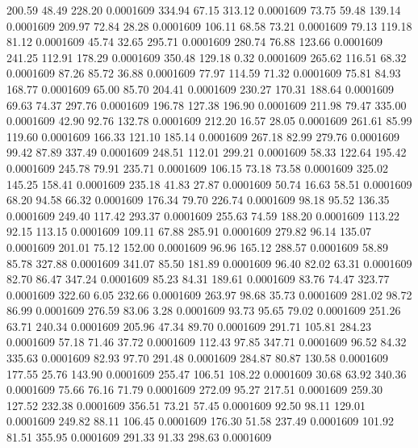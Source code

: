  200.59   48.49  228.20   0.0001609
 334.94   67.15  313.12   0.0001609
  73.75   59.48  139.14   0.0001609
 209.97   72.84   28.28   0.0001609
 106.11   68.58   73.21   0.0001609
  79.13  119.18   81.12   0.0001609
  45.74   32.65  295.71   0.0001609
 280.74   76.88  123.66   0.0001609
 241.25  112.91  178.29   0.0001609
 350.48  129.18    0.32   0.0001609
 265.62  116.51   68.32   0.0001609
  87.26   85.72   36.88   0.0001609
  77.97  114.59   71.32   0.0001609
  75.81   84.93  168.77   0.0001609
  65.00   85.70  204.41   0.0001609
 230.27  170.31  188.64   0.0001609
  69.63   74.37  297.76   0.0001609
 196.78  127.38  196.90   0.0001609
 211.98   79.47  335.00   0.0001609
  42.90   92.76  132.78   0.0001609
 212.20   16.57   28.05   0.0001609
 261.61   85.99  119.60   0.0001609
 166.33  121.10  185.14   0.0001609
 267.18   82.99  279.76   0.0001609
  99.42   87.89  337.49   0.0001609
 248.51  112.01  299.21   0.0001609
  58.33  122.64  195.42   0.0001609
 245.78   79.91  235.71   0.0001609
 106.15   73.18   73.58   0.0001609
 325.02  145.25  158.41   0.0001609
 235.18   41.83   27.87   0.0001609
  50.74   16.63   58.51   0.0001609
  68.20   94.58   66.32   0.0001609
 176.34   79.70  226.74   0.0001609
  98.18   95.52  136.35   0.0001609
 249.40  117.42  293.37   0.0001609
 255.63   74.59  188.20   0.0001609
 113.22   92.15  113.15   0.0001609
 109.11   67.88  285.91   0.0001609
 279.82   96.14  135.07   0.0001609
 201.01   75.12  152.00   0.0001609
  96.96  165.12  288.57   0.0001609
  58.89   85.78  327.88   0.0001609
 341.07   85.50  181.89   0.0001609
  96.40   82.02   63.31   0.0001609
  82.70   86.47  347.24   0.0001609
  85.23   84.31  189.61   0.0001609
  83.76   74.47  323.77   0.0001609
 322.60    6.05  232.66   0.0001609
 263.97   98.68   35.73   0.0001609
 281.02   98.72   86.99   0.0001609
 276.59   83.06    3.28   0.0001609
  93.73   95.65   79.02   0.0001609
 251.26   63.71  240.34   0.0001609
 205.96   47.34   89.70   0.0001609
 291.71  105.81  284.23   0.0001609
  57.18   71.46   37.72   0.0001609
 112.43   97.85  347.71   0.0001609
  96.52   84.32  335.63   0.0001609
  82.93   97.70  291.48   0.0001609
 284.87   80.87  130.58   0.0001609
 177.55   25.76  143.90   0.0001609
 255.47  106.51  108.22   0.0001609
  30.68   63.92  340.36   0.0001609
  75.66   76.16   71.79   0.0001609
 272.09   95.27  217.51   0.0001609
 259.30  127.52  232.38   0.0001609
 356.51   73.21   57.45   0.0001609
  92.50   98.11  129.01   0.0001609
 249.82   88.11  106.45   0.0001609
 176.30   51.58  237.49   0.0001609
 101.92   81.51  355.95   0.0001609
 291.33   91.33  298.63   0.0001609
